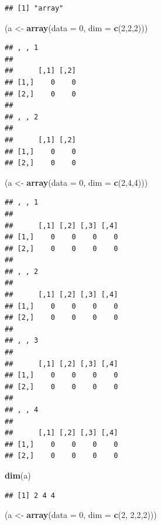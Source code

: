 \documentclass[]{book}
\newenvironment{Shaded}{\begin{snugshade}}{\end{snugshade}}
\newcommand{\KeywordTok}[1]{\textcolor[rgb]{0.13,0.29,0.53}{\textbf{#1}}}
\newcommand{\DataTypeTok}[1]{\textcolor[rgb]{0.13,0.29,0.53}{#1}}
\newcommand{\DecValTok}[1]{\textcolor[rgb]{0.00,0.00,0.81}{#1}}
\newcommand{\StringTok}[1]{\textcolor[rgb]{0.31,0.60,0.02}{#1}}
\newcommand{\NormalTok}[1]{#1}
\theoremstyle{definition}
\theoremstyle{definition}
\theoremstyle{definition}
\theoremstyle{remark}
\begin{document}
\begin{verbatim}
## [1] "array"
\end{verbatim}

\begin{Shaded}
\begin{Highlighting}[]
\NormalTok{(a <-}\StringTok{ }\KeywordTok{array}\NormalTok{(}\DataTypeTok{data =} \DecValTok{0}\NormalTok{, }\DataTypeTok{dim =} \KeywordTok{c}\NormalTok{(}\DecValTok{2}\NormalTok{,}\DecValTok{2}\NormalTok{,}\DecValTok{2}\NormalTok{)))}
\end{Highlighting}
\end{Shaded}

\begin{verbatim}
## , , 1
## 
##      [,1] [,2]
## [1,]    0    0
## [2,]    0    0
## 
## , , 2
## 
##      [,1] [,2]
## [1,]    0    0
## [2,]    0    0
\end{verbatim}

\begin{Shaded}
\begin{Highlighting}[]
\NormalTok{(a <-}\StringTok{ }\KeywordTok{array}\NormalTok{(}\DataTypeTok{data =} \DecValTok{0}\NormalTok{, }\DataTypeTok{dim =} \KeywordTok{c}\NormalTok{(}\DecValTok{2}\NormalTok{,}\DecValTok{4}\NormalTok{,}\DecValTok{4}\NormalTok{)))}
\end{Highlighting}
\end{Shaded}

\begin{verbatim}
## , , 1
## 
##      [,1] [,2] [,3] [,4]
## [1,]    0    0    0    0
## [2,]    0    0    0    0
## 
## , , 2
## 
##      [,1] [,2] [,3] [,4]
## [1,]    0    0    0    0
## [2,]    0    0    0    0
## 
## , , 3
## 
##      [,1] [,2] [,3] [,4]
## [1,]    0    0    0    0
## [2,]    0    0    0    0
## 
## , , 4
## 
##      [,1] [,2] [,3] [,4]
## [1,]    0    0    0    0
## [2,]    0    0    0    0
\end{verbatim}

\begin{Shaded}
\begin{Highlighting}[]
\KeywordTok{dim}\NormalTok{(a)}
\end{Highlighting}
\end{Shaded}

\begin{verbatim}
## [1] 2 4 4
\end{verbatim}

\begin{Shaded}
\begin{Highlighting}[]
\NormalTok{(a <-}\StringTok{ }\KeywordTok{array}\NormalTok{(}\DataTypeTok{data =} \DecValTok{0}\NormalTok{, }\DataTypeTok{dim =} \KeywordTok{c}\NormalTok{(}\DecValTok{2}\NormalTok{, }\DecValTok{2}\NormalTok{,}\DecValTok{2}\NormalTok{,}\DecValTok{2}\NormalTok{)))}
\end{Highlighting}
\end{Shaded}
\end{document}

